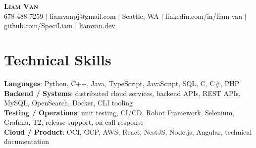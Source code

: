 \documentclass[letterpaper,11pt]{article}
\begin{document}

%
\begin{center}
    \textbf{\Huge \scshape Liam Van} \\ \vspace{1pt}
    \small 678-488-7259 $|$ \small {liamvanpj@gmail.com} $|$ Seattle, WA
 {{$|$ linkedin.com/in/liam-van} {$|$ github.com/SpeciLiam} {$|$ \href{https://liamvan.dev}{liamvan.dev}}}

\end{center}

\section{Technical Skills}
 \begin{itemize}[leftmargin=0.15in, label={}]
    \small{\item{
     \textbf{Languages}{: Python, C++, Java, TypeScript, JavaScript, SQL, C, C\#, PHP} \\
     \textbf{Backend / Systems}{: distributed cloud services, backend APIs, REST APIs, MySQL, OpenSearch, Docker, CLI tooling} \\
     \textbf{Testing / Operations}{: unit testing, CI/CD, Robot Framework, Selenium, Grafana, T2, release support, on-call response} \\
     \textbf{Cloud / Product}{: OCI, GCP, AWS, React, NestJS, Node.js, Angular, technical documentation} \\
    }}
 \end{itemize}
%

\end{document}
